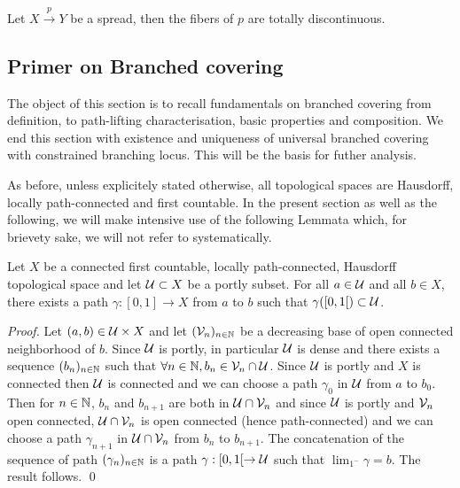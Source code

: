 \begin{cor}[\cite{MR2198590}]\label{cor:totdiscont} Let $X\xrightarrow{p} Y$ be a spread, then the fibers of $p$ are totally discontinuous. 
\end{cor}






\subsection{Primer on Branched covering} \label{sec:branched_base}

The object of this section is to recall fundamentals on branched covering from definition, 
 to path-lifting characterisation, basic properties and composition. We end this section 
 with existence and uniqueness of universal branched covering with constrained 
 branching locus.  This will be the basis for futher analysis.

As before, unless explicitely stated otherwise, all topological spaces are Hausdorff, 
locally path-connected and first countable.
In the present section as well as the following, we will make intensive use of the following Lemmata which, for brievety sake, we will not refer to systematically.


\begin{lem}\label{lem:path_covering} Let $X$ be a connected first countable, locally path-connected, Hausdorff topological space and let $\mathcal{U}\subset X$ be a portly subset. 
For all $a\in \mathcal{U}$ and all $b\in X$, there exists a path $\gamma: [0,1]\rightarrow X$  from $a$ to $b$ such that $\gamma([0,1[)\subset \mathcal{U}$.
\end{lem}
\begin{proof}
 Let $(a,b) \in \mathcal{U}\times X$ and let $(\mathcal V_n)_{n\in \mathbb{N}}$ be a decreasing base of open connected neighborhood of $b$. Since $\mathcal{U}$ is portly, in particular $\mathcal{U}$ is dense and there exists a sequence $(b_n)_{n\in \mathbb{N}}$ such that  $\forall  n\in \mathbb{N}, b_n \in \mathcal V_n\cap \mathcal{U}$. Since $\mathcal{U}$ is portly and $X$ is connected then $\mathcal{U}$ is connected and we can choose a path $\gamma_0$ in $\mathcal{U}$ from $a$ to $b_0$. Then for $n\in \mathbb{N}$, $b_n$ and $b_{n+1}$ are both in $\mathcal{U}\cap \mathcal V_n$ and since $\mathcal{U}$ is portly and $\mathcal V_n$ open connected, $\mathcal{U}\cap \mathcal V_n$ is open connected (hence path-connected) and we can choose a path $\gamma_{n+1}$ in $\mathcal{U}\cap \mathcal V_n$ from $b_n$ to $b_{n+1}$. The concatenation of the sequence of path $(\gamma_n)_{n\in \mathbb{N}}$ is a path $\gamma:[0,1[\rightarrow \mathcal{U}$ such that $\lim_{1^-}\gamma = b$. The result follows.
\qed\end{proof} 

